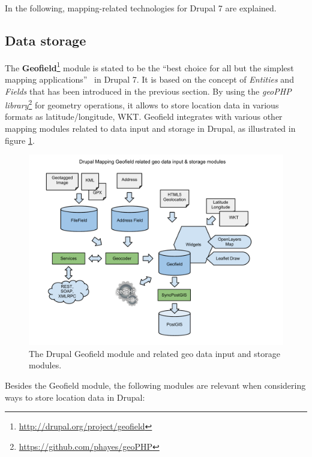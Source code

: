 In the following, mapping-related technologies for Drupal 7 are explained. 

\subsection{Data storage}

The \textbf{Geofield}\footnote{\url{http://drupal.org/project/geofield}} module is stated to be the ``best choice for all but the simplest mapping applications''~\cite[page 27]{Zzolo11mappingdrupal} in Drupal 7. It is based on the concept of \textit{Entities} and \textit{Fields} that has been introduced in the previous section. By using the \textit{geoPHP library}\footnote{\url{https://github.com/phayes/geoPHP}} for geometry operations, it allows to store location data in various formats as latitude/longitude, WKT. Geofield integrates with various other mapping modules related to data input and storage in Drupal, as illustrated in figure \ref{fig:geofield}.

\begin{figure}[h]
  \begin{center}
    \includegraphics[width=1.2\textwidth]{figures/drupal_mapping_geofield.pdf}
    \caption{The Drupal Geofield module and related geo data input and storage modules.}
    \label{fig:geofield}
  \end{center}
\end{figure}

Besides the Geofield module, the following modules are relevant when considering ways to store location data in Drupal: 

